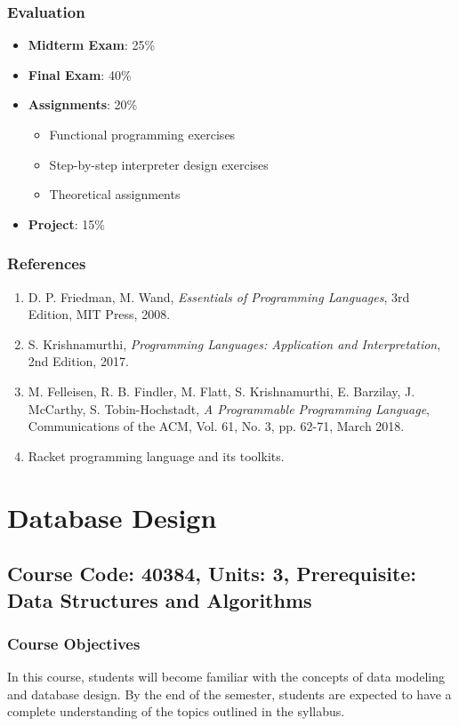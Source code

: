 \documentclass[12pt]{article}
\begin{document}
\subsubsection*{Evaluation}
\begin{itemize}
    \item \textbf{Midterm Exam}: 25\%
    \item \textbf{Final Exam}: 40\%
    \item \textbf{Assignments}: 20\%
        \begin{itemize}
            \item Functional programming exercises
            \item Step-by-step interpreter design exercises
            \item Theoretical assignments
        \end{itemize}
    \item \textbf{Project}: 15\%
\end{itemize}

\subsubsection*{References}
\begin{enumerate}
    \item D. P. Friedman, M. Wand, \textit{Essentials of Programming Languages}, 3rd Edition, MIT Press, 2008.
    \item S. Krishnamurthi, \textit{Programming Languages: Application and Interpretation}, 2nd Edition, 2017.
    \item M. Felleisen, R. B. Findler, M. Flatt, S. Krishnamurthi, E. Barzilay, J. McCarthy, S. Tobin-Hochstadt, \textit{A Programmable Programming Language}, Communications of the ACM, Vol. 61, No. 3, pp. 62-71, March 2018.
    \item Racket programming language and its toolkits.
\end{enumerate}

\newpage

\section{Database Design}
\subsection*{Course Code: 40384, Units: 3, Prerequisite: Data Structures and Algorithms}

\subsubsection*{Course Objectives}
In this course, students will become familiar with the concepts of data modeling and database design. By the end of the semester, students are expected to have a complete understanding of the topics outlined in the syllabus.
\end{document}
